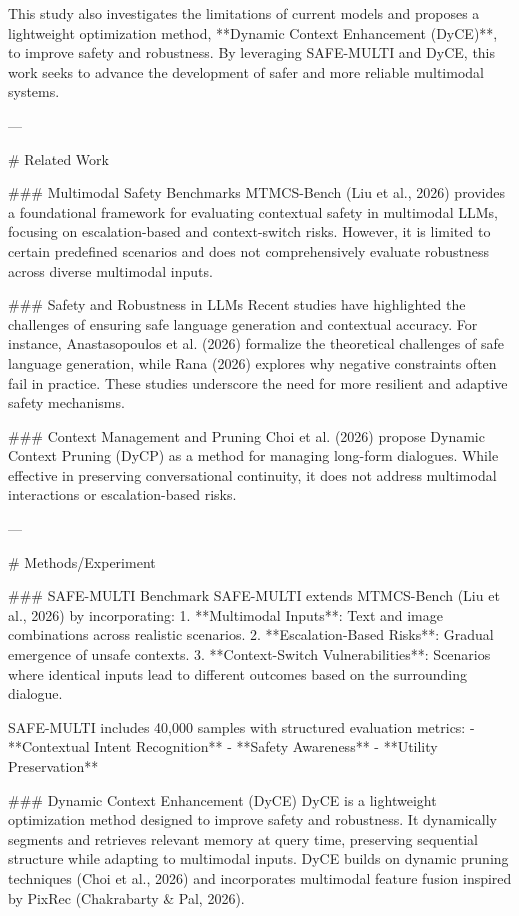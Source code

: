 This study also investigates the limitations of current models and proposes a lightweight optimization method, **Dynamic Context Enhancement (DyCE)**, to improve safety and robustness. By leveraging SAFE-MULTI and DyCE, this work seeks to advance the development of safer and more reliable multimodal systems.

---

# Related Work  

### Multimodal Safety Benchmarks  
MTMCS-Bench (Liu et al., 2026) provides a foundational framework for evaluating contextual safety in multimodal LLMs, focusing on escalation-based and context-switch risks. However, it is limited to certain predefined scenarios and does not comprehensively evaluate robustness across diverse multimodal inputs.

### Safety and Robustness in LLMs  
Recent studies have highlighted the challenges of ensuring safe language generation and contextual accuracy. For instance, Anastasopoulos et al. (2026) formalize the theoretical challenges of safe language generation, while Rana (2026) explores why negative constraints often fail in practice. These studies underscore the need for more resilient and adaptive safety mechanisms.

### Context Management and Pruning  
Choi et al. (2026) propose Dynamic Context Pruning (DyCP) as a method for managing long-form dialogues. While effective in preserving conversational continuity, it does not address multimodal interactions or escalation-based risks.

---

# Methods/Experiment  

### SAFE-MULTI Benchmark  
SAFE-MULTI extends MTMCS-Bench (Liu et al., 2026) by incorporating:  
1. **Multimodal Inputs**: Text and image combinations across realistic scenarios.  
2. **Escalation-Based Risks**: Gradual emergence of unsafe contexts.  
3. **Context-Switch Vulnerabilities**: Scenarios where identical inputs lead to different outcomes based on the surrounding dialogue.

SAFE-MULTI includes 40,000 samples with structured evaluation metrics:  
- **Contextual Intent Recognition**  
- **Safety Awareness**  
- **Utility Preservation**  

### Dynamic Context Enhancement (DyCE)  
DyCE is a lightweight optimization method designed to improve safety and robustness. It dynamically segments and retrieves relevant memory at query time, preserving sequential structure while adapting to multimodal inputs. DyCE builds on dynamic pruning techniques (Choi et al., 2026) and incorporates multimodal feature fusion inspired by PixRec (Chakrabarty & Pal, 2026).

